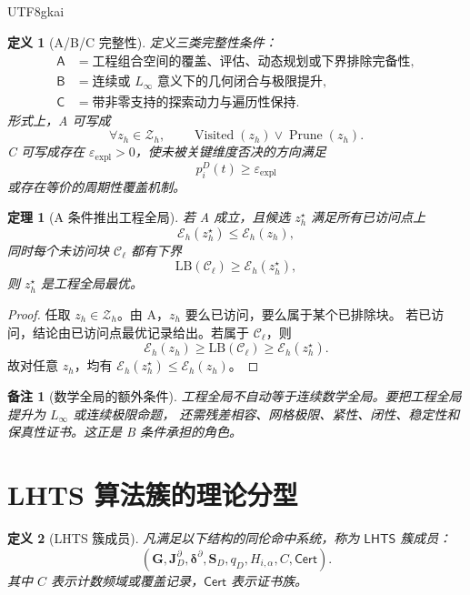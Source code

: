 \documentclass[12pt]{article}
\newtheorem{definition}{定义}[section]
\newtheorem{theorem}{定理}[section]
\newtheorem{remark}{备注}[section]
\newcommand{\LHTS}{\ensuremath{\mathsf{LHTS}}}
\newcommand{\Cert}{\ensuremath{\mathsf{Cert}}}
\newcommand{\Linfty}{\ensuremath{L_\infty}}
\DeclareMathOperator{\Prune}{Prune}
\DeclareMathOperator{\Visited}{Visited}
\begin{document}
\begin{CJK*}{UTF8}{gkai}
\begin{definition}[A/B/C 完整性]
\label{def:lhts-abc}
定义三类完整性条件：
\[
\begin{aligned}
\mathsf A
&=
\text{工程组合空间的覆盖、评估、动态规划或下界排除完备性},\\
\mathsf B
&=
\text{连续或 }\Linfty\text{ 意义下的几何闭合与极限提升},\\
\mathsf C
&=
\text{带非零支持的探索动力与遍历性保持}.
\end{aligned}
\]
形式上，A 可写成
\[
  \forall z_h\in\mathcal Z_h,\qquad
  \Visited(z_h)\vee \Prune(z_h).
\]
C 可写成存在 \(\varepsilon_{\mathrm{expl}}>0\)，使未被关键维度否决的方向满足
\[
  p_i^D(t)\ge \varepsilon_{\mathrm{expl}}
\]
或存在等价的周期性覆盖机制。
\end{definition}

\begin{theorem}[A 条件推出工程全局]
\label{thm:lhts-a-global}
若 A 成立，且候选 \(z_h^\star\) 满足所有已访问点上
\[
  \mathcal E_h(z_h^\star)\le \mathcal E_h(z_h),
\]
同时每个未访问块 \(\mathcal C_\ell\) 都有下界
\[
  \mathrm{LB}(\mathcal C_\ell)\ge \mathcal E_h(z_h^\star),
\]
则 \(z_h^\star\) 是工程全局最优。
\end{theorem}

\begin{proof}
任取 \(z_h\in\mathcal Z_h\)。由 A，\(z_h\) 要么已访问，要么属于某个已排除块。
若已访问，结论由已访问点最优记录给出。若属于 \(\mathcal C_\ell\)，则
\[
  \mathcal E_h(z_h)
  \ge
  \mathrm{LB}(\mathcal C_\ell)
  \ge
  \mathcal E_h(z_h^\star).
\]
故对任意 \(z_h\)，均有
\(\mathcal E_h(z_h^\star)\le\mathcal E_h(z_h)\)。
\end{proof}

\begin{remark}[数学全局的额外条件]
工程全局不自动等于连续数学全局。要把工程全局提升为 \(\Linfty\) 或连续极限命题，
还需残差相容、网格极限、紧性、闭性、稳定性和保真性证书。这正是 B 条件承担的角色。
\end{remark}

\section{LHTS 算法簇的理论分型}
\label{sec:lhts-family-types}

\begin{definition}[LHTS 簇成员]
凡满足以下结构的同伦命中系统，称为 \LHTS{} 簇成员：
\[
  \left(
  \mathbf G,
  \mathbf J_D^\partial,
  \boldsymbol\delta^\partial,
  \mathbf S_D,
  q_D,
  H_{i,\alpha},
  C,
  \Cert
  \right).
\]
其中 \(C\) 表示计数频域或覆盖记录，\(\Cert\) 表示证书族。
\end{definition}


\end{CJK*}
\end{document}
